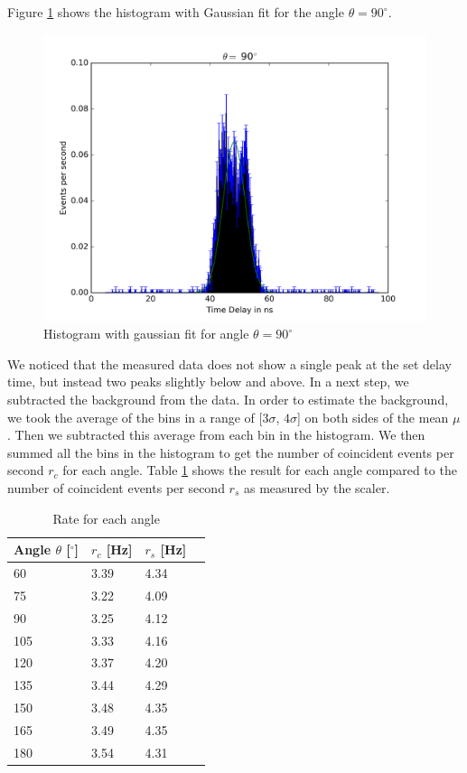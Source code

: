 \documentclass[a4paper,parskip,11pt, DIV12]{scrreprt}
\begin{document}
Figure \ref{fig:hist120} shows the histogram with Gaussian fit for the angle $\theta = 90^{\circ}$.
%
\begin{figure}[H]
\centering
\includegraphics[scale=0.65]{90deg.png}
\caption[Histogram]{Histogram with gaussian fit for angle $\theta = 90^{\circ}$}
\label{fig:hist120}
\end{figure}
%
We noticed that the measured data does not show a single peak at the set delay time, but instead two peaks slightly below and above. In a next step, we subtracted the background from the data. In order to estimate the background, we took the average of the bins in a range of [$3\sigma$, $4\sigma$] on both sides of the mean $\mu$. Then we subtracted this average from each bin in the histogram. We then summed all the bins in the histogram to get the number of coincident events per second $r_c$ for each angle. Table \ref{tab:nevents} shows the result for each angle compared to the number of coincident events per second $r_{s}$ as measured by the scaler.
%
\begin{table}[H]
\begin{center}
\begin{tabular}{llll}
Angle $\theta$ [$^{\circ}$] & $r_{c}$ [Hz] & $r_{s}$ [Hz]\\
\hline
60 	& 3.39 & 4.34\\
  75 	& 3.22 & 4.09\\
  90 	& 3.25 & 4.12\\
105 	& 3.33 & 4.16\\
120	& 3.37 & 4.20\\
135	& 3.44 & 4.29\\
150	& 3.48 & 4.35\\
165	& 3.49 & 4.35\\
180	& 3.54 & 4.31\\ 
\end{tabular}
\caption{Rate for each angle}
\label{tab:nevents}
\end{center}
\end{table}
\end{document}
